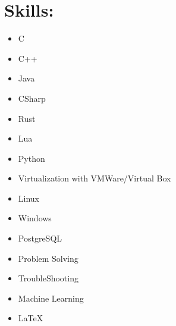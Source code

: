 \documentclass[12pt, oneside, a4paper]{article}
\begin{document}
    \section*{Skills:}
    \begin{itemize}
    \footnotesize
    \item C
    \item C++
    \item Java
    \item CSharp
    \item Rust
    \item Lua
    \item Python
    \item Virtualization with VMWare/Virtual Box
    \item Linux
    \item Windows
    \item PostgreSQL
    \item Problem Solving
    \item TroubleShooting
    \item Machine Learning
    \item LaTeX
    \end{itemize}
\end{document}

